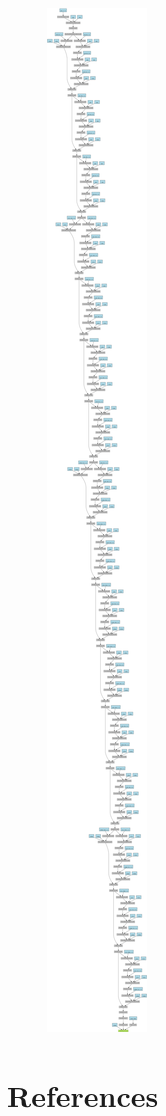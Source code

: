 \documentclass[
  a4paper,
]{book}
\newlength{\cslhangindent}
\newlength{\cslentryspacingunit} %
\newenvironment{CSLReferences}[2] %
 {%
  \setlength{\parindent}{0pt}
  \ifodd #1
  \let\oldpar\par
  \def\par{\hangindent=\cslhangindent\oldpar}
  \fi
  \setlength{\parskip}{#2\cslentryspacingunit}
 }%
 {}
\numberwithin{equation}{section}
\theoremstyle{plain}
\theoremstyle{remark}
\begin{document}
\begin{figure}[H]

{\centering \includegraphics{./appendix_py_files/figure-pdf/cell-8-output-1.svg}

}

\end{figure}


\hypertarget{references}{%
\chapter*{References}\label{references}}


\hypertarget{refs}{}
\begin{CSLReferences}{0}{0}
\end{CSLReferences}


\backmatter
\end{document}

